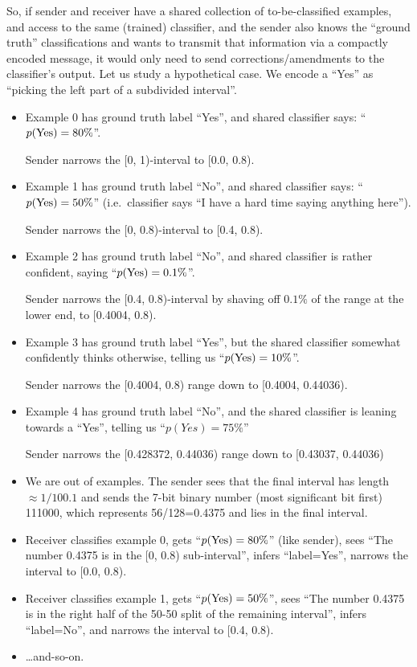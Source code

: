 \documentclass[11pt]{article}
\begin{document}
So, if sender and receiver have a shared collection of to-be-classified
examples, and access to the same (trained) classifier, and the sender
also knows the ``ground truth'' classifications and wants to transmit
that information via a compactly encoded message, it would only need to
send corrections/amendments to the classifier's output. Let us study a
hypothetical case. We encode a ``Yes'' as ``picking the left part of a
subdivided interval''.

\begin{itemize}
\item
  Example 0 has ground truth label ``Yes'', and shared classifier says:
  ``\(p({\rm Yes})=80\mbox{\%}\)''.

  Sender narrows the {[}0, 1)-interval to {[}0.0, 0.8).
\item
  Example 1 has ground truth label ``No'', and shared classifier says:
  ``\(p({\rm Yes})=50\mbox{\%}\)'' (i.e.~classifier says ``I have a hard
  time saying anything here'').

  Sender narrows the {[}0, 0.8)-interval to {[}0.4, 0.8).
\item
  Example 2 has ground truth label ``No'', and shared classifier is
  rather confident, saying ``\(p({\rm Yes})=0.1\mbox{\%}\)''.

  Sender narrows the {[}0.4, 0.8)-interval by shaving off
  \(0.1\mbox{\%}\) of the range at the lower end, to {[}0.4004, 0.8).
\item
  Example 3 has ground truth label ``Yes'', but the shared classifier
  somewhat confidently thinks otherwise, telling us
  ``\(p({\rm Yes})=10\mbox{\%}\)''.

  Sender narrows the {[}0.4004, 0.8) range down to {[}0.4004, 0.44036).
\item
  Example 4 has ground truth label ``No'', and the shared classifier is
  leaning towards a ``Yes'', telling us ``\(p({Yes})=75\mbox{\%}\)''

  Sender narrows the {[}0.428372, 0.44036) range down to {[}0.43037,
  0.44036)
\item
  We are out of examples. The sender sees that the final interval has
  length \(\approx 1/100.1\) and sends the 7-bit binary number (most
  significant bit first) 111000, which represents 56/128=0.4375 and lies
  in the final interval.
\item
  Receiver classifies example 0, gets ``\(p({\rm Yes})=80\mbox{\%}\)''
  (like sender), sees ``The number 0.4375 is in the {[}0, 0.8)
  sub-interval'', infers ``label=Yes'', narrows the interval to {[}0.0,
  0.8).
\item
  Receiver classifies example 1, gets ``\(p({\rm Yes})=50\mbox{\%}\)'',
  sees ``The number 0.4375 is in the right half of the 50-50 split of
  the remaining interval'', infers ``label=No'', and narrows the
  interval to {[}0.4, 0.8).
\item
  \ldots and-so-on.
\end{itemize}
\end{document}
